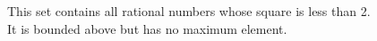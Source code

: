 \documentclass[preview]{standalone}
\begin{document}
\begin{center}
This set contains all rational numbers whose square is less than 2.\\It is bounded above but has no maximum element.
\end{center}
\end{document}
